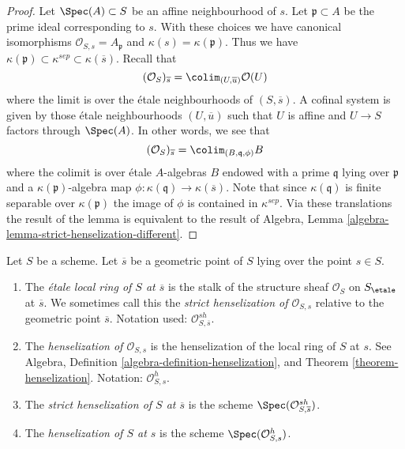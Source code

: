 \begin{proof}
Let $\Spec(A) \subset S$ be an affine neighbourhood of $s$.
Let $\mathfrak p \subset A$ be the prime ideal corresponding to $s$.
With these choices we have canonical isomorphisms
$\mathcal{O}_{S, s} = A_{\mathfrak p}$ and $\kappa(s) = \kappa(\mathfrak p)$.
Thus we have
$\kappa(\mathfrak p) \subset \kappa^{sep} \subset \kappa(\overline{s})$.
Recall that
$$
(\mathcal{O}_S)_{\overline{s}} =
\colim_{(U, \overline{u})} \mathcal{O}(U)
$$
where the limit is over the \'etale neighbourhoods of $(S, \overline{s})$.
A cofinal system is given by those \'etale neighbourhoods $(U, \overline{u})$
such that $U$ is affine and $U \to S$ factors through $\Spec(A)$.
In other words, we see that
$$
(\mathcal{O}_S)_{\overline{s}} = \colim_{(B, \mathfrak q, \phi)} B
$$
where the colimit is over \'etale $A$-algebras $B$ endowed with a prime
$\mathfrak q$ lying over $\mathfrak p$ and a
$\kappa(\mathfrak p)$-algebra map
$\phi : \kappa(\mathfrak q) \to \kappa(\overline{s})$.
Note that since $\kappa(\mathfrak q)$ is finite separable over
$\kappa(\mathfrak p)$ the image of $\phi$ is contained in $\kappa^{sep}$.
Via these translations the result of the lemma is equivalent
to the result of
Algebra, Lemma \ref{algebra-lemma-strict-henselization-different}.
\end{proof}

\begin{definition}
\label{definition-etale-local-rings}
Let $S$ be a scheme. Let $\overline{s}$ be a geometric point of $S$
lying over the point $s \in S$.
\begin{enumerate}
\item The {\it \'etale local ring of $S$ at $\overline{s}$}
is the stalk of the structure sheaf $\mathcal{O}_S$ on $S_\etale$
at $\overline{s}$. We sometimes call this the
{\it strict henselization of $\mathcal{O}_{S, s}$} relative
to the geometric point $\overline{s}$.
Notation used: $\mathcal{O}_{S, \overline{s}}^{sh}$.
\item The {\it henselization of $\mathcal{O}_{S, s}$} is the
henselization of the local ring of $S$ at $s$. See
Algebra, Definition \ref{algebra-definition-henselization},
and
Theorem \ref{theorem-henselization}.
Notation: $\mathcal{O}_{S, s}^h$.
\item The {\it strict henselization of $S$ at $\overline{s}$}
is the scheme $\Spec(\mathcal{O}_{S, \overline{s}}^{sh})$.
\item The {\it henselization of $S$ at $s$} is the scheme
$\Spec(\mathcal{O}_{S, s}^h)$.
\end{enumerate}
\end{definition}

